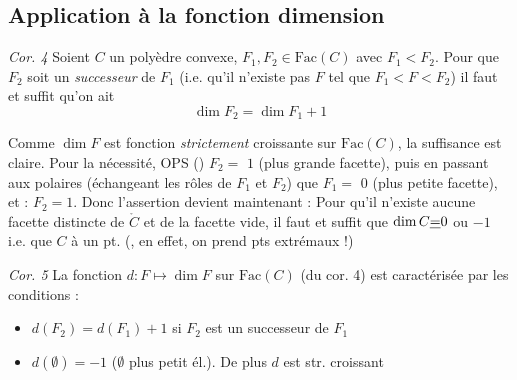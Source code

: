\documentclass[11pt,a4paper]{article}
\begin{document}



\subsection{Application à la fonction dimension}

\emph{Cor. 4} Soient $C$ un polyèdre convexe, $F_1, F_2 \in \mathrm{Fac}(C)$
avec $F_1 < F_2$. Pour que $F_2$ soit un \emph{successeur} de $F_1$ (i.e.
qu'il n'existe pas $F$ tel que $F_1 < F < F_2$) il faut et suffit qu'on ait
\[
  \dim F_2 = \dim F_1 + 1
\]

Comme $\dim F$ est fonction \emph{strictement} croissante sur
$\mathrm{Fac}(C)$, la suffisance est claire. Pour la nécessité,
 OPS ()
$F_2 =$  $1$ (plus grande facette), 
puis en passant aux polaires (échangeant les rôles de $F_1$ et $F_2$) que
$F_1 =$ \struck{$\emptyset$} $0$ (plus petite facette), et :
 $F_2 = 1$. Donc l'assertion devient maintenant : Pour
qu'il n'existe aucune facette distincte de $\mathring{C}$ et de la facette
vide, il faut et suffit que $\dim C \uncertain{=} 0$ ou $-1$ i.e. que $C$
  à un pt. \struck{\ill{}}
(, en effet, on prend pts extrémaux !)

\emph{Cor. 5} La fonction $d : F \mapsto \dim F$ sur $\mathrm{Fac}(C)$ (du
cor. 4) est caractérisée par les conditions :
\begin{itemize}
  \item[a)] $d(F_2) = d(F_1) + 1$ si $F_2$ est un successeur de $F_1$
  \item[b)] $d(\emptyset) = -1$ ($\emptyset$ plus petit él.). De plus $d$ est
    str. croissant
\end{itemize}
\end{document}
